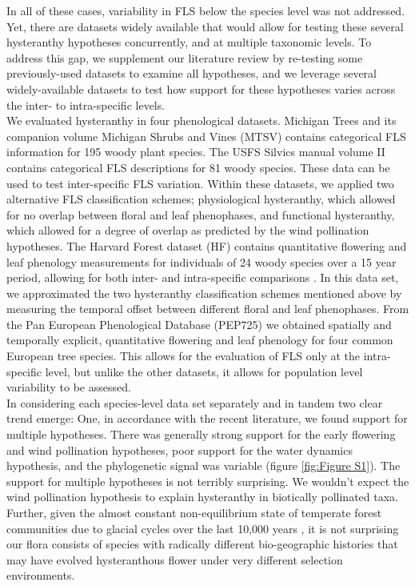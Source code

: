 \documentclass[12pt]{article}\usepackage[]{graphicx}\usepackage[]{color}
\begin{document}
\indent In all of these cases, variability in FLS below the species level was not addressed. Yet, there are datasets widely available that would allow for testing these several hysteranthy hypotheses concurrently, and at multiple taxonomic levels. To address this gap, we supplement our literature review by re-testing some previously-used datasets to examine all hypotheses, and we leverage several widely-available datasets to test how support for these hypotheses varies across the inter- to intra-specific levels.\\ 
\indent We evaluated hysteranthy in four phenological datasets. Michigan Trees and its companion volume Michigan Shrubs and Vines \citep{Barnes2004,Barnes2016} (MTSV) contains categorical FLS information for 195 woody plant species. The USFS Silvics manual volume II \citep{Burns1990} contains categorical FLS descriptions for 81 woody species. These data can be used to test inter-specific FLS variation. Within these datasets, we applied two alternative FLS classification schemes; physiological hysteranthy, which allowed for no overlap between floral and leaf phenophases, and functional hysteranthy, which allowed for a degree of overlap as predicted by the wind pollination hypotheses. The Harvard Forest dataset (HF) contains quantitative flowering and leaf phenology measurements for individuals of 24 woody species over a 15 year period, allowing for both inter- and intra-specific comparisons \citep{OKeefe2015}. In this data set, we approximated the two hysteranthy classification schemes mentioned above by measuring the temporal offset between different floral and leaf phenophases. From the Pan European Phenological Database (PEP725) \citep{PEP725} we obtained spatially and temporally explicit, quantitative flowering and leaf phenology for four common European tree species. This allows for the evaluation of FLS only at the intra-specific level, but unlike the other datasets, it allows for population level variability to be assessed.\\
\indent In considering each species-level data set separately and in tandem two clear trend emerge: One, in accordance with the recent literature, we found support for multiple hypotheses. There was generally strong support for the early flowering and wind pollination hypotheses, poor support for the water dynamics hypothesis, and the phylogenetic signal was variable (figure \ref{fig:Figure S1}). The support for multiple hypotheses is not terribly surprising. We wouldn't expect the wind pollination hypothesis to explain hysteranthy in biotically pollinated taxa. Further, given the almost constant non-equilibrium state of temperate forest communities due to glacial cycles over the last 10,000 years \citep{Spurr1980}, it is not surprising our flora consists of species with radically different bio-geographic histories that may have evolved hysteranthous flower under very different selection environments. \\
\end{document}
